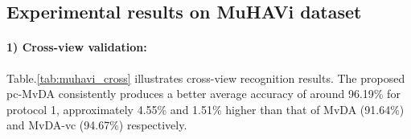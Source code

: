
\subsection{Experimental results on MuHAVi dataset}
    \paragraph{1) Cross-view validation:} Table.\ref{tab:muhavi_cross} illustrates cross-view recognition results. The proposed pc-MvDA consistently produces a better average accuracy of around 96.19\% for protocol 1, approximately 4.55\% and 1.51\% higher than that of MvDA (91.64\%) and MvDA-vc (94.67\%) respectively.

    \begin{table}[htbp]
    \centering
    \caption{Cross-view recognition comparison on MuHAVi dataset.}
    \label{tab:muhavi_cross}
    \end{table}


